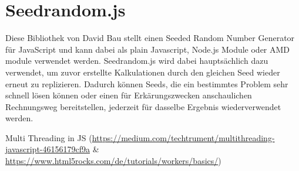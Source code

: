 \section{Seedrandom.js}
Diese Bibliothek von David Bau stellt einen Seeded Random Number Generator für JavaScript und kann dabei als plain Javascript, Node.js Module oder AMD module verwendet werden. Seedrandom.js wird dabei hauptsächlich dazu verwendet, um zuvor erstellte Kalkulationen durch den gleichen Seed wieder erneut zu replizieren. Dadurch können Seeds, die ein bestimmtes Problem sehr schnell lösen können oder einen für Erkärungszwecken anschaulichen Rechnungsweg bereitstellen, jederzeit für dasselbe Ergebnis wiederverwendet werden.


Multi Threading in JS (\url{https://medium.com/techtrument/multithreading-javascript-46156179cf9a} \& \url{https://www.html5rocks.com/de/tutorials/workers/basics/})

